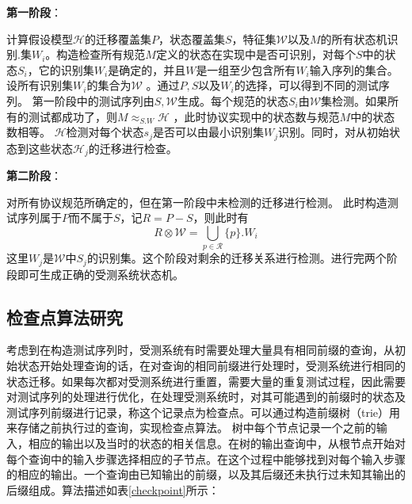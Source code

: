 \textbf{第一阶段}：

计算假设模型$\mathsf{\mathcal{H}}$的迁移覆盖集$P$，状态覆盖集$S$，特征集$\mathsf{\mathcal{W}}$以及$M$的所有状态机识别.集${{W}_{i}}$。构造检查所有规范$M$定义的状态在实现中是否可识别，对每个$S$中的状态${{S}_{i}}$，它的识别集${{W}_{i}}$是确定的，并且$W$是一组至少包含所有${{W}_{i}}$输入序列的集合。设所有识别集${{W}_{i}}$的集合为$\mathcal{W}$ 。通过$P,S$以及$W_i$的选择，可以得到不同的测试序列。
第一阶段中的测试序列由$S,\mathsf{\mathcal{W}}$生成。每个规范的状态${{S}_{i}}$由$\mathsf{\mathcal{W}}$集检测。如果所有的测试都成功了，则$M{{\approx }_{S.W}}\mathsf{\mathcal{H}}$ ，此时协议实现中的状态数与规范$M$中的状态数相等。
$\mathsf{\mathcal{H}}$检测对每个状态${{s}_{j}}$是否可以由最小识别集${{W}_{j}}$识别。同时，对从初始状态到这些状态$\mathsf{\mathcal{H}}{{\mathsf{}}_{j}}$的迁移进行检查。

\textbf{第二阶段}：

对所有协议规范所确定的，但在第一阶段中未检测的迁移进行检测。
此时构造测试序列属于$P$而不属于$S$，记$R=P-S$，则此时有
\[R\otimes \mathsf{\mathcal{W}}=\bigcup\limits_{p\in \mathsf{\mathcal{R}}}{\{p\}.}{{W}_{i}}\]
这里${{W}_{j}}$是$\mathsf{\mathcal{W}}$中${{S}_{j}}$的识别集。这个阶段对剩余的迁移关系进行检测。进行完两个阶段即可生成正确的受测系统状态机。






\subsection{检查点算法研究}
考虑到在构造测试序列时，受测系统有时需要处理大量具有相同前缀的查询，从初始状态开始处理查询的话，在对查询的相同前缀进行处理时，受测系统进行相同的状态迁移。如果每次都对受测系统进行重置，需要大量的重复测试过程，因此需要对测试序列的处理进行优化，在处理受测系统时，对其可能遇到的前缀时的状态及测试序列前缀进行记录，称这个记录点为检查点。可以通过构造前缀树（trie）用来存储之前执行过的查询，实现检查点算法。
树中每个节点记录一个之前的输入，相应的输出以及当时的状态的相关信息。在树的输出查询中，从根节点开始对每个查询中的输入步骤选择相应的子节点。在这个过程中能够找到对每个输入步骤的相应的输出。一个查询由已知输出的前缀，以及其后缀还未执行过未知其输出的后缀组成。算法描述如表\ref{checkpoint}所示：


